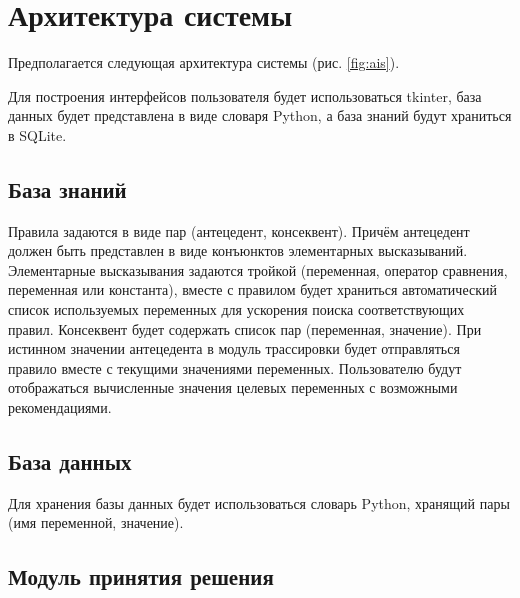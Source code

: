 \section{Архитектура системы}

Предполагается следующая архитектура системы (рис. \ref{fig:ais}).


Для построения интерфейсов пользователя будет использоваться tkinter, база данных будет представлена в виде словаря Python, а база знаний будут храниться в SQLite.

\subsection{База знаний}

Правила задаются в виде пар (антецедент, консеквент).
Причём антецедент должен быть представлен в виде конъюнктов элементарных высказываний.
Элементарные высказывания задаются тройкой (переменная, оператор сравнения, переменная или константа),
вместе с правилом будет храниться автоматический список используемых переменных для ускорения поиска соответствующих правил.
Консеквент будет содержать список пар (переменная, значение).
При истинном значении антецедента в модуль трассировки будет отправляться правило вместе с текущими значениями переменных.
Пользователю будут отображаться вычисленные значения целевых переменных с возможными рекомендациями.

\subsection{База данных}

Для хранения базы данных будет использоваться словарь Python, хранящий пары (имя переменной, значение).

\subsection{Модуль принятия решения}
